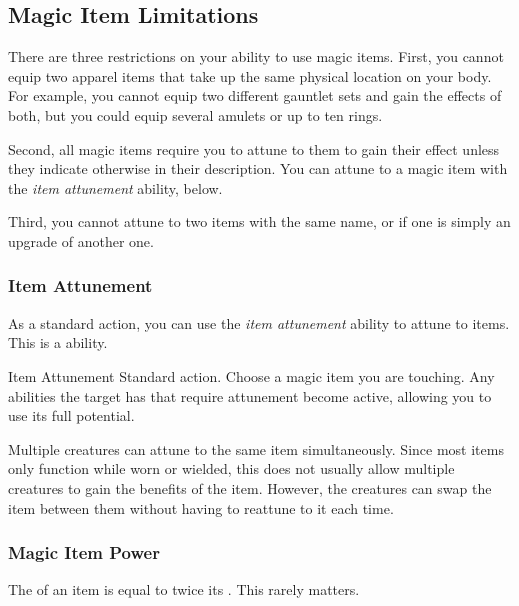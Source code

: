 
  \subsection{Magic Item Limitations}

    There are three restrictions on your ability to use magic items.
    First, you cannot equip two apparel items that take up the same physical location on your body.
    For example, you cannot equip two different gauntlet sets and gain the effects of both, but you could equip several amulets or up to ten rings.

    Second, all magic items require you to attune to them to gain their effect unless they indicate otherwise in their description.
    You can attune to a magic item with the \textit{item attunement} ability, below.

    Third, you cannot attune to two items with the same name, or if one is simply an upgrade of another one.

    \subsubsection{Item Attunement}\label{Item Attunement}

      As a standard action, you can use the \textit{item attunement} ability to attune to items.
      This is a \magical ability.

      \begin{attuneability}{Item Attunement}{}
        \abilityusagetime Standard action.
        \rankline
        Choose a magic item you are touching.
        Any abilities the target has that require attunement become active, allowing you to use its full potential.
      \end{attuneability}

       Multiple creatures can attune to the same item simultaneously.
      Since most items only function while worn or wielded, this does not usually allow multiple creatures to gain the benefits of the item.
      However, the creatures can swap the item between them without having to reattune to it each time.

    \subsubsection{Magic Item Power}\label{Magic Item Power}
      The  of an item is equal to twice its .
      This rarely matters.


